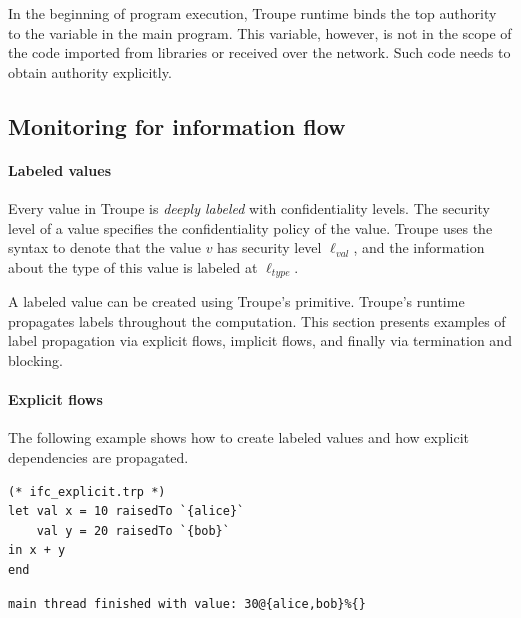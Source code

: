 In the beginning of program execution, Troupe runtime binds the top authority to the variable  in the main program. This variable, however, is not in the scope of the code imported from libraries or received over the network. Such code needs to obtain authority explicitly. 




%
%
%
\subsection{Monitoring for information flow}



\paragraph{Labeled values}
Every value in Troupe is \emph{deeply labeled} with confidentiality
levels. The security level of 
a value specifies the confidentiality policy of the 
value. Troupe uses the syntax  to 
denote that the value $\mathit{v}$ has security level 
$\mathit{\ell_{\mathit{val}}}$, and the information about the type of this value is labeled at $\mathit{\ell_{\mathit{type}}}$.

A labeled value can be created using Troupe's 
primitive. Troupe's runtime propagates labels throughout the computation.
This section presents examples of label propagation via explicit flows, implicit flows, and
finally via termination and blocking.


\paragraph{Explicit flows}
The following example shows how to create labeled values and how explicit dependencies are propagated.
\begin{lstlisting}
(* ifc_explicit.trp *)
let val x = 10 raisedTo `{alice}`
    val y = 20 raisedTo `{bob}`
in x + y
end
\end{lstlisting}
\begin{verbatim}
main thread finished with value: 30@{alice,bob}%{}
\end{verbatim}



